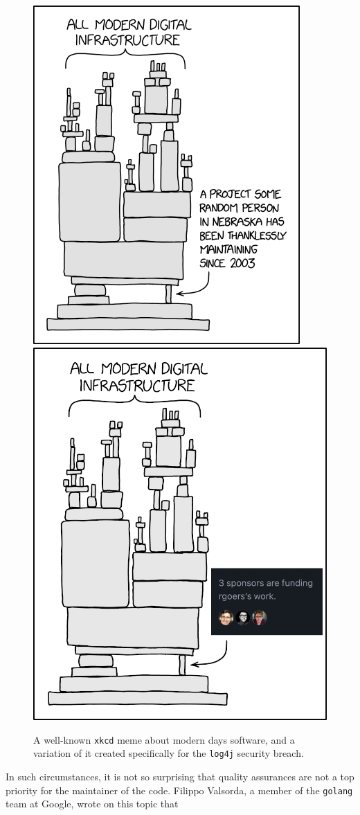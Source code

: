 \begin{figure}[ht!]
  \includegraphics[width=0.5\linewidth-0.5\columnsep]{images/dependency.png}\hspace*{\columnsep}\includegraphics[width=0.5\linewidth-0.5\columnsep]{images/sponsors.png}
  \caption{\label{fig:log4j_dependency}A well-known \texttt{xkcd} meme about modern days software, and a variation of it created specifically for the \texttt{log4j} security breach.}
\end{figure}

In such circumstances, it is not so surprising that quality assurances are not a top priority for the maintainer of the code.
Filippo Valsorda, a member of the \texttt{golang} team at Google, wrote on this topic that 

